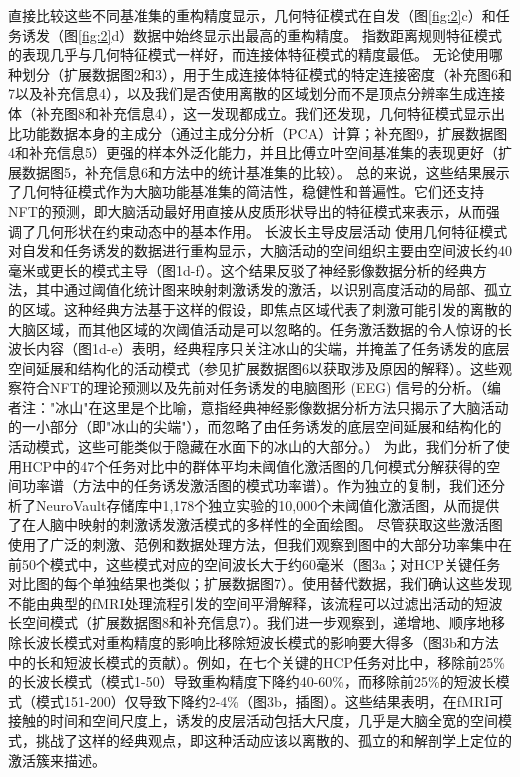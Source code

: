 \documentclass[lang=cn,a4paper,newtx]{elegantpaper}
\begin{document}
直接比较这些不同基准集的重构精度显示，几何特征模式在自发（图\ref{fig:2}c）和任务诱发（图\ref{fig:2}d）数据中始终显示出最高的重构精度。
指数距离规则特征模式的表现几乎与几何特征模式一样好，而连接体特征模式的精度最低。
无论使用哪种划分（扩展数据图2和3），用于生成连接体特征模式的特定连接密度（补充图6和7以及补充信息4），以及我们是否使用离散的区域划分而不是顶点分辨率生成连接体（补充图8和补充信息4），这一发现都成立。我们还发现，几何特征模式显示出比功能数据本身的主成分（通过主成分分析（PCA）计算；补充图9，扩展数据图4和补充信息5）更强的样本外泛化能力，并且比傅立叶空间基准集的表现更好（扩展数据图5，补充信息6和方法中的统计基准集的比较）。      总的来说，这些结果展示了几何特征模式作为大脑功能基准集的简洁性，稳健性和普遍性。它们还支持NFT的预测，即大脑活动最好用直接从皮质形状导出的特征模式来表示，从而强调了几何形状在约束动态中的基本作用。
长波长主导皮层活动      使用几何特征模式对自发和任务诱发的数据进行重构显示，大脑活动的空间组织主要由空间波长约40毫米或更长的模式主导（图1d-f）。这个结果反驳了神经影像数据分析的经典方法，其中通过阈值化统计图来映射刺激诱发的激活，以识别高度活动的局部、孤立的区域。这种经典方法基于这样的假设，即焦点区域代表了刺激可能引发的离散的大脑区域，而其他区域的次阈值活动是可以忽略的。任务激活数据的令人惊讶的长波长内容（图1d-e）表明，经典程序只关注冰山的尖端，并掩盖了任务诱发的底层空间延展和结构化的活动模式（参见扩展数据图6以获取涉及原因的解释）。这些观察符合NFT的理论预测以及先前对任务诱发的电脑图形 (EEG) 信号的分析。（编者注："冰山"在这里是个比喻，意指经典神经影像数据分析方法只揭示了大脑活动的一小部分（即"冰山的尖端"），而忽略了由任务诱发的底层空间延展和结构化的活动模式，这些可能类似于隐藏在水面下的冰山的大部分。）      为此，我们分析了使用HCP中的47个任务对比中的群体平均未阈值化激活图的几何模式分解获得的空间功率谱（方法中的任务诱发激活图的模式功率谱）。作为独立的复制，我们还分析了NeuroVault存储库中1,178个独立实验的10,000个未阈值化激活图，从而提供了在人脑中映射的刺激诱发激活模式的多样性的全面绘图。      尽管获取这些激活图使用了广泛的刺激、范例和数据处理方法，但我们观察到图中的大部分功率集中在前50个模式中，这些模式对应的空间波长大于约60毫米（图3a；对HCP关键任务对比图的每个单独结果也类似；扩展数据图7）。使用替代数据，我们确认这些发现不能由典型的fMRI处理流程引发的空间平滑解释，该流程可以过滤出活动的短波长空间模式（扩展数据图8和补充信息7）。我们进一步观察到，递增地、顺序地移除长波长模式对重构精度的影响比移除短波长模式的影响要大得多（图3b和方法中的长和短波长模式的贡献）。例如，在七个关键的HCP任务对比中，移除前25\%的长波长模式（模式1-50）导致重构精度下降约40-60\%，而移除前25\%的短波长模式（模式151-200）仅导致下降约2-4\%（图3b，插图）。这些结果表明，在fMRI可接触的时间和空间尺度上，诱发的皮层活动包括大尺度，几乎是大脑全宽的空间模式，挑战了这样的经典观点，即这种活动应该以离散的、孤立的和解剖学上定位的激活簇来描述。
\end{document}
